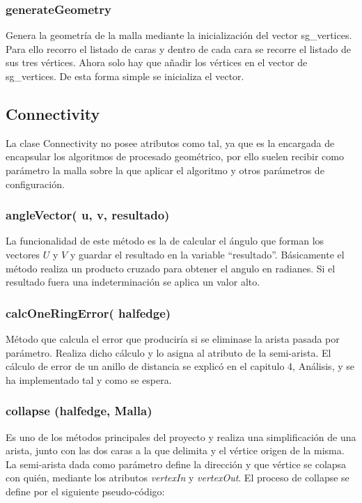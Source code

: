 \subsubsection*{generateGeometry}
Genera la geometría de la malla mediante la inicialización del vector sg\_vertices. Para ello recorro el listado de caras y dentro de cada cara se recorre el listado de sus tres vértices. Ahora solo hay que añadir los vértices en el vector de sg\_vertices. De esta forma simple se inicializa el vector.


\subsection{Connectivity}

La clase Connectivity no posee atributos como tal, ya que es la encargada de encapsular los algoritmos de procesado geométrico, por ello suelen recibir como parámetro la malla sobre la que aplicar el algoritmo y otros parámetros de configuración.

\subsubsection*{angleVector( u, v, resultado)}
La funcionalidad de este método es la de calcular el ángulo que forman los vectores $U$ y $V$ y guardar el resultado en la variable ``resultado''. Básicamente el método realiza un producto cruzado para obtener el angulo en radianes. Si el resultado fuera una indeterminación se aplica un valor alto.

\subsubsection*{calcOneRingError( halfedge)}
Método que calcula el error que produciría si se eliminase la arista pasada por parámetro. Realiza dicho cálculo y lo asigna al atributo de la semi-arista. El cálculo de error de un anillo de distancia se explicó en el capitulo 4, Análisis, y se ha implementado tal y como se espera.

\newpage
\subsubsection*{collapse (halfedge, Malla)}
Es uno de los métodos principales del proyecto y realiza una simplificación de una arista, junto con las dos caras a la que delimita y el vértice origen de la misma. La semi-arista dada como parámetro define la dirección y que vértice se colapsa con quién, mediante los atributos \textit{vertexIn} y \textit{vertexOut}. El proceso de collapse se define por el siguiente pseudo-código:


